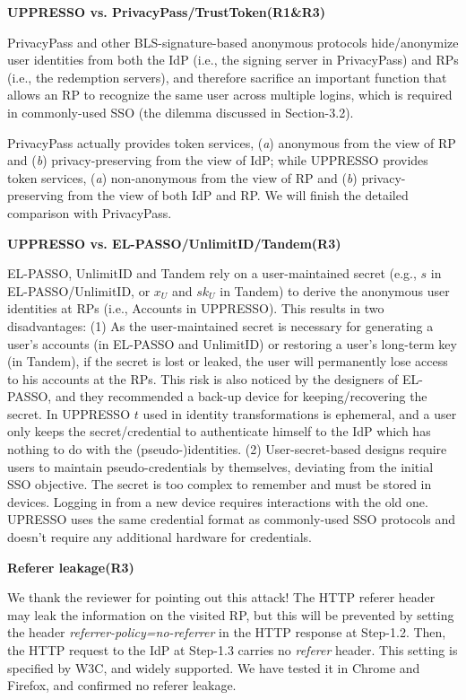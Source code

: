 \documentclass{article}
\begin{document}
\textbf{UPPRESSO vs. PrivacyPass/TrustToken(R1\&R3)}

PrivacyPass and other BLS-signature-based anonymous protocols hide/anonymize user identities from both the IdP (i.e., the signing server in PrivacyPass)
 and RPs (i.e., the redemption servers), and therefore sacrifice an important function that allows an RP to recognize the same user across multiple logins, which is required in commonly-used SSO (the dilemma discussed in Section-3.2).

PrivacyPass actually provides token services, (\emph{a}) anonymous from the view of RP and (\emph{b}) privacy-preserving from the view of IdP; while UPPRESSO provides token services, (\emph{a}) non-anonymous from the view of RP and (\emph{b}) privacy-preserving from the view of both IdP and RP. We will finish the detailed comparison with PrivacyPass.


\textbf{UPPRESSO vs. EL-PASSO/UnlimitID/Tandem(R3)}

EL-PASSO, UnlimitID and Tandem rely on a user-maintained secret (e.g., $s$ in EL-PASSO/UnlimitID, or $x_U$ and $sk_U$ in Tandem) to derive the anonymous user identities at RPs (i.e., Accounts in UPPRESSO).
This results in two disadvantages:
 (1) As the user-maintained secret is necessary for generating a user's accounts (in EL-PASSO and UnlimitID) or restoring a user's long-term key (in Tandem), if the secret is lost or leaked, the user will permanently lose access to his accounts at the RPs.
This risk is also noticed by the designers of EL-PASSO,
    and they recommended a back-up device for keeping/recovering the secret.
In UPPRESSO $t$ used in identity transformations is ephemeral,
     and a user only keeps the secret/credential to authenticate himself to the IdP which has nothing to do with the (pseudo-)identities.
(2) User-secret-based designs require users to maintain pseudo-credentials by themselves, deviating from the initial SSO objective.
The secret is too complex to remember and must be stored in devices. Logging in from a new device requires interactions with the old one.
UPRESSO uses the same credential format as commonly-used SSO protocols and doesn't require any additional hardware for credentials.


\textbf{Referer leakage(R3)}

We thank the reviewer for pointing out this attack! The HTTP referer header may leak the information on the visited RP, but this will be prevented by setting the header \emph{referrer-policy=no-referrer} in the HTTP response at Step-1.2. Then, the HTTP request to the IdP at Step-1.3 carries no \emph{referer} header.
This setting is specified by W3C, and widely supported.
We have tested it in Chrome and Firefox, and confirmed no referer leakage.
\end{document}

